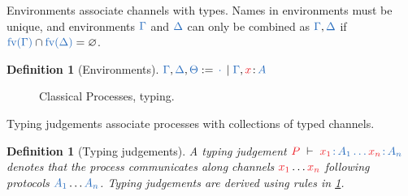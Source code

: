 \documentclass[submission,copyright,creativecommons]{eptcs}
\newtheorem{definition}[lemma]{Definition}
\begin{document}
Environments associate channels with types. Names in environments must be unique, and environments $\ty{\Gamma}$ and $\ty{\Delta}$ can only be combined as $\ty{\Gamma}, \ty{\Delta}$ if $\ty{\fv{\Gamma}} \cap \ty{\fv{\Delta}} = \varnothing$.
\begin{definition}[Environments]\label{def:cp-environments}
  \(
    \ty{\Gamma}, \ty{\Delta}, \ty{\Theta} := \ty{\emptycontext} \mid \ty{\Gamma}, \tmty{x}{A}
  \)
\end{definition}\noindent
\begin{figure}[htb]
  \begin{center}\cpInfAx    \cpInfCut   \end{center}
  \begin{center}\cpInfTens  \cpInfParr  \end{center}
  \begin{center}\cpInfBot   \cpInfOne   \end{center}
  \begin{center}  \end{center}
  \begin{center}\cpInfWith              \end{center}
  \begin{center}\cpInfNil   \cpInfTop   \end{center}
  \caption{Classical Processes, typing.}
  \label{fig:cp}
\end{figure}\noindent
Typing judgements associate processes with collections of typed channels.
\begin{definition}[Typing judgements]\label{def:cp}
  A typing judgement $\seq[{ P }]{\tmty{x_1}{A_1}\dots\tmty{x_n}{A_n}}$ denotes
  that the process  communicates along channels $\tm{x_1}\dots\tm{x_n}$
  following protocols $\ty{A_1}\dots\ty{A_n}$.
  Typing judgements are derived using rules in \cref{fig:cp}.
\end{definition}\noindent
\end{document}
